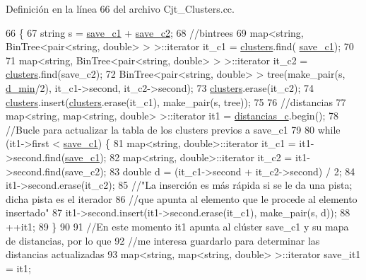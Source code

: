 Definición en la línea 66 del archivo Cjt\+\_\+\+Clusters.\+cc.


\begin{DoxyCode}
66                                    \{
67   \textcolor{keywordtype}{string} s = \hyperlink{class_cjt___clusters_af010e61859190999fb23f1854f4d23aa}{save\_c1} + \hyperlink{class_cjt___clusters_a1406c60345958da0016fa3c0b1cd89f5}{save\_c2};
68   \textcolor{comment}{//bintrees}
69   map<string, BinTree<pair<string, double> > >::iterator it\_c1 = \hyperlink{class_cjt___clusters_a866c5a14f8f50598be2af9fd8c115dd2}{clusters}.find(
      \hyperlink{class_cjt___clusters_af010e61859190999fb23f1854f4d23aa}{save\_c1});
70 
71   map<string, BinTree<pair<string, double> > >::iterator it\_c2 = \hyperlink{class_cjt___clusters_a866c5a14f8f50598be2af9fd8c115dd2}{clusters}.find(save\_c2);
72   BinTree<pair<string, double> > tree(make\_pair(s, \hyperlink{class_cjt___clusters_a1b94b5f25778ee95796a9be966f1c619}{d\_min}/2), it\_c1->second, it\_c2->second);
73   \hyperlink{class_cjt___clusters_a866c5a14f8f50598be2af9fd8c115dd2}{clusters}.erase(it\_c2);
74   \hyperlink{class_cjt___clusters_a866c5a14f8f50598be2af9fd8c115dd2}{clusters}.insert(\hyperlink{class_cjt___clusters_a866c5a14f8f50598be2af9fd8c115dd2}{clusters}.erase(it\_c1), make\_pair(s, tree));
75 
76   \textcolor{comment}{//distancias}
77   map<string, map<string, double> >::iterator it1 = \hyperlink{class_cjt___clusters_a2b912c7987fd370bdeaf5dabb966240f}{distancias\_c}.begin();
78   \textcolor{comment}{//Bucle para actualizar la tabla de los clusters previos a save\_c1}
79 
80   \textcolor{keywordflow}{while} (it1->first < \hyperlink{class_cjt___clusters_af010e61859190999fb23f1854f4d23aa}{save\_c1}) \{
81     map<string, double>::iterator it\_c1 = it1->second.find(\hyperlink{class_cjt___clusters_af010e61859190999fb23f1854f4d23aa}{save\_c1});
82     map<string, double>::iterator it\_c2 = it1->second.find(save\_c2);
83     \textcolor{keywordtype}{double} d = (it\_c1->second + it\_c2->second) / 2;
84     it1->second.erase(it\_c2);
85     \textcolor{comment}{//"La inserción es más rápida si se le da una pista; dicha pista es el iterador}
86     \textcolor{comment}{//que apunta al elemento que le procede al elemento insertado"}
87     it1->second.insert(it1->second.erase(it\_c1), make\_pair(s, d));
88     ++it1;
89   \}
90 
91   \textcolor{comment}{//En este momento it1 apunta al clúster save\_c1 y su mapa de distancias, por lo que}
92   \textcolor{comment}{//me interesa guardarlo para determinar las distancias actualizadas}
93   map<string, map<string, double> >::iterator save\_it1 = it1;

\end{DoxyCode}

